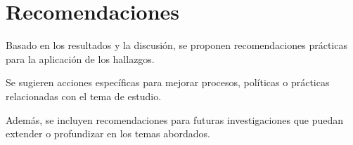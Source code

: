 \section{Recomendaciones}
\label{sec:recomendaciones}

Basado en los resultados y la discusión, se proponen recomendaciones prácticas para la aplicación de los hallazgos.

Se sugieren acciones específicas para mejorar procesos, políticas o prácticas relacionadas con el tema de estudio.

Además, se incluyen recomendaciones para futuras investigaciones que puedan extender o profundizar en los temas abordados.